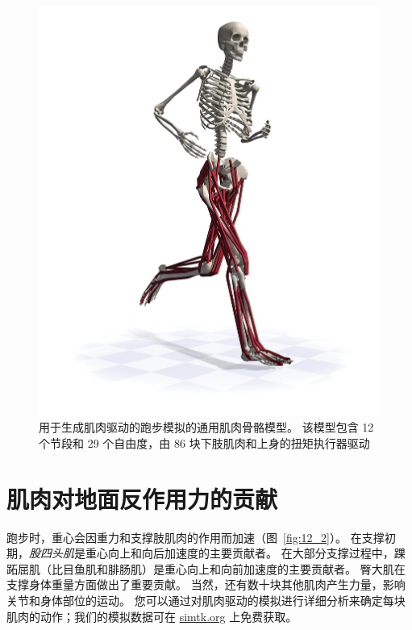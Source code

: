 \begin{figure}[!htb]
	\centering
	\includegraphics[width=1.0\linewidth]{chap12/12_1}
	\caption{用于生成肌肉驱动的跑步模拟的通用肌肉骨骼模型。
		该模型包含 12 个节段和 29 个自由度，由 86 块下肢肌肉和上身的扭矩执行器驱动\cite{rajagopal2016full} \label{fig:12_1}}
\end{figure}


\section{肌肉对地面反作用力的贡献}

跑步时，重心会因重力和支撑肢肌肉的作用而加速（图~\ref{fig:12_2}）。
在支撑初期，\textit{股四头肌}是重心向上和向后加速度的主要贡献者。
在大部分支撑过程中，踝跖屈肌（比目鱼肌和腓肠肌）是重心向上和向前加速度的主要贡献者。
臀大肌在支撑身体重量方面做出了重要贡献。
当然，还有数十块其他肌肉产生力量，影响关节和身体部位的运动。
您可以通过对肌肉驱动的模拟进行详细分析来确定每块肌肉的动作；我们的模拟数据可在 \href{simtk.org}{simtk.org} 上免费获取。


